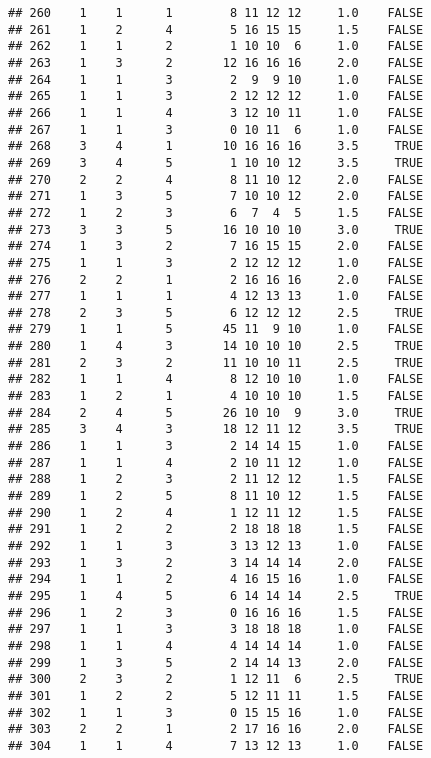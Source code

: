 \documentclass[]{article}
\begin{document}
\begin{verbatim}
## 260    1    1      1        8 11 12 12     1.0    FALSE
## 261    1    2      4        5 16 15 15     1.5    FALSE
## 262    1    1      2        1 10 10  6     1.0    FALSE
## 263    1    3      2       12 16 16 16     2.0    FALSE
## 264    1    1      3        2  9  9 10     1.0    FALSE
## 265    1    1      3        2 12 12 12     1.0    FALSE
## 266    1    1      4        3 12 10 11     1.0    FALSE
## 267    1    1      3        0 10 11  6     1.0    FALSE
## 268    3    4      1       10 16 16 16     3.5     TRUE
## 269    3    4      5        1 10 10 12     3.5     TRUE
## 270    2    2      4        8 11 10 12     2.0    FALSE
## 271    1    3      5        7 10 10 12     2.0    FALSE
## 272    1    2      3        6  7  4  5     1.5    FALSE
## 273    3    3      5       16 10 10 10     3.0     TRUE
## 274    1    3      2        7 16 15 15     2.0    FALSE
## 275    1    1      3        2 12 12 12     1.0    FALSE
## 276    2    2      1        2 16 16 16     2.0    FALSE
## 277    1    1      1        4 12 13 13     1.0    FALSE
## 278    2    3      5        6 12 12 12     2.5     TRUE
## 279    1    1      5       45 11  9 10     1.0    FALSE
## 280    1    4      3       14 10 10 10     2.5     TRUE
## 281    2    3      2       11 10 10 11     2.5     TRUE
## 282    1    1      4        8 12 10 10     1.0    FALSE
## 283    1    2      1        4 10 10 10     1.5    FALSE
## 284    2    4      5       26 10 10  9     3.0     TRUE
## 285    3    4      3       18 12 11 12     3.5     TRUE
## 286    1    1      3        2 14 14 15     1.0    FALSE
## 287    1    1      4        2 10 11 12     1.0    FALSE
## 288    1    2      3        2 11 12 12     1.5    FALSE
## 289    1    2      5        8 11 10 12     1.5    FALSE
## 290    1    2      4        1 12 11 12     1.5    FALSE
## 291    1    2      2        2 18 18 18     1.5    FALSE
## 292    1    1      3        3 13 12 13     1.0    FALSE
## 293    1    3      2        3 14 14 14     2.0    FALSE
## 294    1    1      2        4 16 15 16     1.0    FALSE
## 295    1    4      5        6 14 14 14     2.5     TRUE
## 296    1    2      3        0 16 16 16     1.5    FALSE
## 297    1    1      3        3 18 18 18     1.0    FALSE
## 298    1    1      4        4 14 14 14     1.0    FALSE
## 299    1    3      5        2 14 14 13     2.0    FALSE
## 300    2    3      2        1 12 11  6     2.5     TRUE
## 301    1    2      2        5 12 11 11     1.5    FALSE
## 302    1    1      3        0 15 15 16     1.0    FALSE
## 303    2    2      1        2 17 16 16     2.0    FALSE
## 304    1    1      4        7 13 12 13     1.0    FALSE

\end{verbatim}
\end{document}
